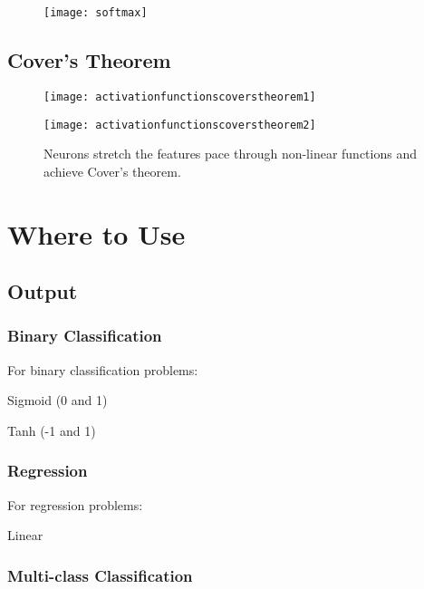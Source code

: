  	\begin{figure}[h]
		\centering
		\texttt{[image: softmax]}
		\caption{}
		\label{fig:softmax}
	\end{figure}


	\subsection{Cover's Theorem}

 	\begin{figure}[h]
		\centering
		\texttt{[image: activationfunctionscoverstheorem1]}
		\caption{}
		\label{fig:activationfunctionscoverstheorem1}
	\end{figure}
 	\begin{figure}[h]
		\centering
		\texttt{[image: activationfunctionscoverstheorem2]}
		\caption{Neurons stretch the features pace through non-linear functions and achieve Cover's theorem.}
		\label{fig:activationfunctionscoverstheorem2}
	\end{figure}

	\section{Where to Use}
	\subsection{Output}
	\subsubsection{Binary Classification}
For binary classification problems:
	\begin{bulletedlist}
		\item Sigmoid (0 and 1)
		\item Tanh (-1 and 1)
	\end{bulletedlist}

	\subsubsection{Regression}
For regression problems:
	\begin{bulletedlist}
		\item Linear
	\end{bulletedlist}

	\subsubsection{Multi-class Classification}

